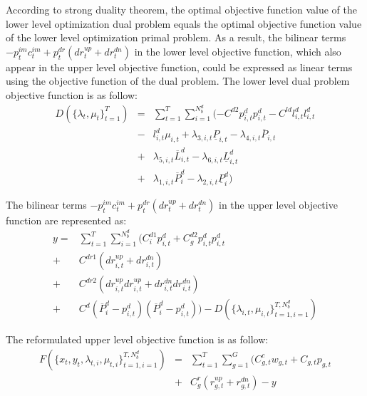 According to strong duality theorem, the optimal objective function value of the lower level optimization dual problem equals the optimal objective function value of the lower level optimization primal problem.  As a result, the bilinear terms $-p^{im}_{t}c^{im}_{t}+p^{dr}_{t}(dr_{t}^{up}+dr_{t}^{dn})$ in the lower level objective function, which also appear in the upper level objective function, could be expressed as linear terms using the objective function of the dual problem. The lower level dual problem objective function is as follow:\\
\begin{equation*}
\begin{array}{lcl}
D(\{\lambda_t,\mu_t\}^{T}_{t=1}) &=& \sum_{t=1}^{T}\sum_{i=1}^{N^d_b}(-C^{d2}p^{d}_{i,t}p^{d}_{i,t} - C^{ld}l^{d}_{i,t}l^{d}_{i,t} \\
&-& l^{d}_{i,t}\mu_{i,t} + \lambda_{3,i,t} \underline{P}_{i,t} -\lambda_{4,i,t} \overline{P}_{i,t} \\
&+&\lambda_{5,i,t} \overline{L}^{d}_{i,t} -\lambda_{6,i,t} \underline{L}^{d}_{i,t}\\
&+&\lambda_{1,i,t} \overline{P}^{d}_{i} -\lambda_{2,i,t} \underline{P}^{d}_{i})
\end{array}
\label{eqn:obj}
\end{equation*}

The bilinear terms $-p^{im}_{t}c^{im}_{t}+p^{dr}_{t}(dr_{t}^{up}+dr_{t}^{dn})$ in the upper level objective function are represented as:
\begin{align*}
y = & \sum_{t=1}^{T}\sum_{i=1}^{N^d_b}(C^{d1}_i p^d_{i,t} +C^{d2}_g p^d_{i,t}  p^d_{i,t} \\
+ &C^{dr1} (dr^{up}_{i,t} + dr^{dn}_{i,t} ) \\
+ &C^{dr2} (dr^{up}_{i,t}dr^{up}_{i,t} + dr^{dn}_{i,t}dr^{dn}_{i,t}  ) \\
+ &C^{d}(\overline{P}^d_{i}-p^d_{i,t})(\overline{P}^d_{i}-p^d_{i,t})) - D(\{\lambda_{i,t},\mu_{i,t}\}^{T,N^d_b}_{t=1,i=1}) 
\end{align*}


The reformulated upper level objective function is as follow:\\
\begin{equation*}
\begin{array}{lcl}
F\left(\{x_t,y_t, \lambda_{t,i}, \mu_{t,i}\}^{T,N^d_b}_{t=1,i=1}\right) &=& \sum_{t=1}^{T}\sum_{g=1}^{G}(C^c_{g,t} w_{g,t}+C_{g,t} p_{g,t} \\
&+&C^r_{g}(r_{g,t}^{up}+r_{g,t}^{dn}) - y
\end{array}
\label{eqn:obj}
\end{equation*}

